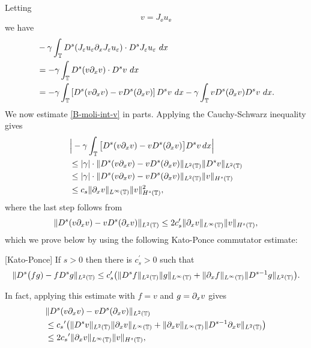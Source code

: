 Letting 
%
\begin{equation} 
\label{v-Je-ue}
v=J_\ee u_\ee
\end{equation}
%
%
we have
%
\begin{equation} 
\begin{split}
\label{B-moli-int-v}
& -  \gamma \int_{\mathbb{T}}   D^s (J_{\varepsilon} u_{\varepsilon} \partial_x J_\varepsilon u_\varepsilon)
\cdot D^s
J_{\varepsilon}u_\varepsilon \ dx  
\\
& = - \gamma \int_{\mathbb{T}}
D^s(v \partial_x v) \cdot   D^s v \ dx
\\
& = - \gamma \int_{\mathbb{T}}
\left [ 
D^s(v\partial_x v)  -  v D^s (\partial_xv)
\right ] 
D^s v \ dx - \gamma \int_{\mathbb{T}}
v D^s (\partial_xv)
D^s v \ dx.
\end{split}
\end{equation}
%
%
%
We now estimate \eqref{B-moli-int-v} in parts. Applying the Cauchy-Schwarz inequality gives
%
\begin{equation} 
\label{int1-est-calc2}
\begin{split}
& \Big|
- \gamma \int_{\mathbb{T}}
\big[ 
D^s(v\partial_x v)  -  v D^s (\partial_xv)
\big]
D^s v   \, dx
\Big|
\\
& \le
|\gamma| \cdot \|
D^s(v\partial_x v)  -  v D^s (\partial_xv)
\|_{L^2(\mathbb{T})}
\|
D^s v 
\|_{L^2(\mathbb{T})}
\\
&\le
|\gamma| \cdot \|
D^s(v\partial_x v)  -  v D^s (\partial_xv)
\|_{L^2(\mathbb{T})}
\|
v
\|_{H^s(\mathbb{T})}
\\
&\le c_s \| \partial_x v \|_{L^\infty(\mathbb{T})} 
\| v \|_{H^s(\mathbb{T})}^2,
\end{split}
\end{equation}
%
where the last step follows from 
%
\begin{equation} 
\label{int1-est-calc3}
\| D^s(v\partial_x v)  -  v D^s (\partial_xv) \|_{L^2(\mathbb{T})}
\le
2 c_s^{\prime}    \| \partial_x v \|_{L^\infty(\mathbb{T})} 
\| v \|_{H^s(\mathbb{T})},
\end{equation}
which we prove below by using the following Kato-Ponce commutator 
estimate:  
\begin{lemma} 
\label{KP-lemma}
[Kato-Ponce]
If  $s>0$ then there is $c_s^{\prime}>0$ such that 
%
\begin{equation} 
\label{KP-com-est}
\| D^{s} \big(fg) -  f D^s g\|_{L^2(\mathbb{T})}
\le
c_s^{\prime}\big(
\| D^{s}f \|_{L^2(\mathbb{T})}    \| g \|_{L^\infty(\mathbb{T})} 
+
\| \partial_xf \|_{L^\infty(\mathbb{T})}    \| D^{s-1}g \|_{L^2(\mathbb{T})}   
\big).
\end{equation}
%
\end{lemma}
%
%
In fact, applying  this estimate with $f=v$ and $g=\partial_xv$ gives 
%
\begin{equation} 
\label{int1-est-calc4}
\begin{split}
& \| D^s(v\partial_x v)  -  v D^s (\partial_xv) \|_{L^2(\mathbb{T})}
\\
& \le
{c_s}^\prime \big(
\| D^{s}v \|_{L^2(\mathbb{T})}    \| \partial_x v \|_{L^\infty(\mathbb{T})} 
+
\| \partial_xv \|_{L^\infty(\mathbb{T})}    \| D^{s-1}\partial_x v \|_{L^2(\mathbb{T})}   
\big)
\\
& \le
2{c_s}^\prime    \| \partial_x v \|_{L^\infty(\mathbb{T})} 
\| v \|_{H^s(\mathbb{T})}, 
\end{split}
\end{equation}
